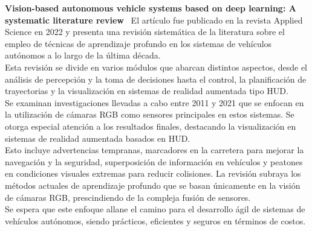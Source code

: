\noindent\textbf{Vision-based autonomous vehicle systems based on deep learning: A systematic literature review}~\cite{pavel2022vision}
El artículo fue publicado en la revista Applied Science en 2022 y presenta una revisión sistemática de la literatura sobre el empleo
de técnicas de aprendizaje profundo en los sistemas
de vehículos autónomos a lo largo de la última década.                                                                    \\Esta revisión se divide en varios módulos que abarcan distintos aspectos,
desde el análisis de percepción y la toma de decisiones hasta el control, la planificación de trayectorias
y la visualización en sistemas de realidad aumentada tipo HUD.                                                                                                                   \\
Se examinan investigaciones llevadas a cabo entre 2011 y 2021 que se enfocan en la utilización de cámaras RGB como sensores principales
en estos sistemas. Se otorga especial atención a los resultados finales, destacando la visualización en sistemas de realidad aumentada
basados en HUD.                                                                                                      \\Esto incluye advertencias tempranas, marcadores en la carretera para mejorar la navegación y la seguridad, superposición
de información en vehículos y peatones en condiciones visuales extremas para reducir colisiones.
La revisión subraya los métodos actuales de aprendizaje profundo que se basan únicamente en la visión de cámaras RGB, prescindiendo de la
compleja fusión de sensores.                                                                     \\Se espera que este enfoque allane el camino para el desarrollo ágil de sistemas de vehículos autónomos,
siendo prácticos, eficientes y seguros en términos de costos.                                                               \\
